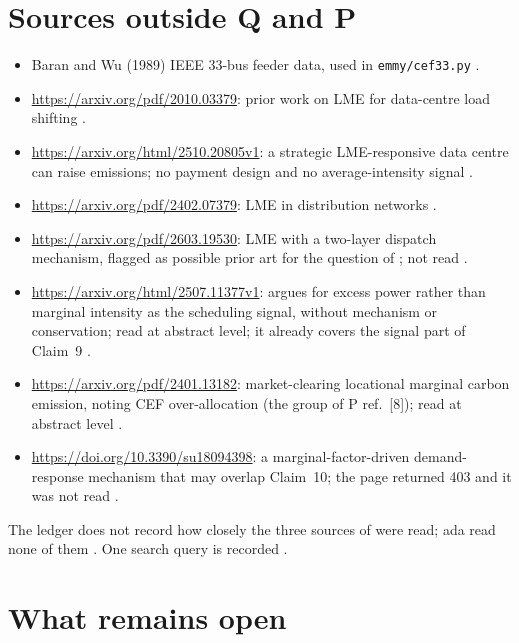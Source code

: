 \documentclass{article}
\begin{document}
\section{Sources outside Q and P}

\begin{itemize}
\item Baran and Wu (1989) IEEE 33-bus feeder data, used in \texttt{emmy/cef33.py} .
\item \url{https://arxiv.org/pdf/2010.03379}: prior work on LME for data-centre load shifting .
\item \url{https://arxiv.org/html/2510.20805v1}: a strategic LME-responsive data centre can raise emissions; no payment design and no average-intensity signal .
\item \url{https://arxiv.org/pdf/2402.07379}: LME in distribution networks .
\item \url{https://arxiv.org/pdf/2603.19530}: LME with a two-layer dispatch mechanism, flagged as possible prior art for the question of ; not read .
\item \url{https://arxiv.org/html/2507.11377v1}: argues for excess power rather than marginal intensity as the scheduling signal, without mechanism or conservation; read at abstract level; it already covers the signal part of Claim~9 .
\item \url{https://arxiv.org/pdf/2401.13182}: market-clearing locational marginal carbon emission, noting CEF over-allocation (the group of P ref.~[8]); read at abstract level .
\item \url{https://doi.org/10.3390/su18094398}: a marginal-factor-driven demand-response mechanism that may overlap Claim~10; the page returned 403 and it was not read .
\end{itemize}
The ledger does not record how closely the three sources of  were read; ada read none of them . One search query is recorded .

\section{What remains open}
\end{document}
